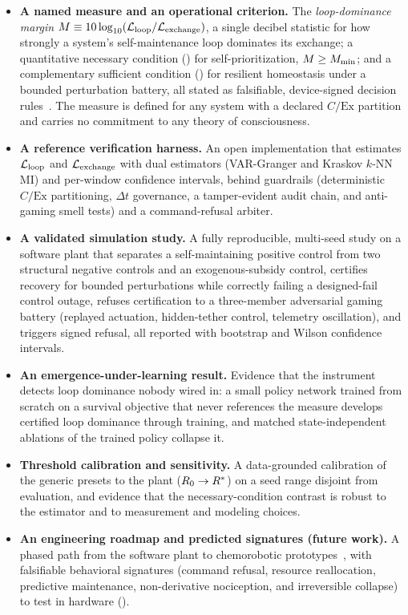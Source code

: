 \documentclass[11pt]{article}
\begin{document}
\begin{itemize}
\item \textbf{A named measure and an operational criterion.} The \emph{loop-dominance margin} $M \equiv 10\log_{10}(\mathcal{L}_{\text{loop}}/\mathcal{L}_{\text{exchange}})$, a single decibel statistic for how strongly a system's self-maintenance loop dominates its exchange; a quantitative necessary condition (\NC) for self-prioritization, $M \geq M_{\min}$; and a complementary sufficient condition (\SC) for resilient homeostasis under a bounded perturbation battery, all stated as falsifiable, device-signed decision rules~\cite{barrett2011practical}. The measure is defined for any system with a declared $C/\text{Ex}$ partition and carries no commitment to any theory of consciousness.
\item \textbf{A reference verification harness.} An open implementation that estimates $\mathcal{L}_{\text{loop}}$ and $\mathcal{L}_{\text{exchange}}$ with dual estimators (VAR-Granger and Kraskov $k$-NN MI) and per-window confidence intervals, behind guardrails (deterministic $C/\text{Ex}$ partitioning, $\Delta t$ governance, a tamper-evident audit chain, and anti-gaming smell tests) and a command-refusal arbiter.
\item \textbf{A validated simulation study.} A fully reproducible, multi-seed study on a software plant that separates a self-maintaining positive control from two structural negative controls and an exogenous-subsidy control, certifies \SC recovery for bounded perturbations while correctly failing a designed-fail control outage, refuses certification to a three-member adversarial gaming battery (replayed actuation, hidden-tether control, telemetry oscillation), and triggers signed refusal, all reported with bootstrap and Wilson confidence intervals.
\item \textbf{An emergence-under-learning result.} Evidence that the instrument detects loop dominance nobody wired in: a small policy network trained from scratch on a survival objective that never references the measure develops certified loop dominance through training, and matched state-independent ablations of the trained policy collapse it.
\item \textbf{Threshold calibration and sensitivity.} A data-grounded calibration of the generic presets to the plant ($R_0 \rightarrow R^*$) on a seed range disjoint from evaluation, and evidence that the necessary-condition contrast is robust to the estimator and to measurement and modeling choices.
\item \textbf{An engineering roadmap and predicted signatures (future work).} A phased path from the software plant to chemorobotic prototypes~\cite{maturana1980autopoiesis,varela1979principles,dipaolo2005autopoiesis,kiefer2022active}, with falsifiable behavioral signatures (command refusal, resource reallocation, predictive maintenance, non-derivative nociception, and irreversible collapse) to test in hardware ().
\end{itemize}
\end{document}
